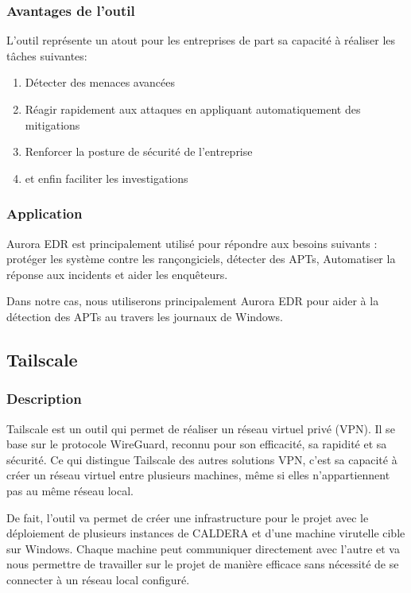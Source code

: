\documentclass[12pt,letterpaper]{article}
\begin{document}
\subsubsection{Avantages de l'outil}

L'outil représente un atout pour les entreprises de part sa capacité à réaliser les tâches suivantes:
\begin{enumerate}
    \item Détecter des menaces avancées
    \item Réagir rapidement aux attaques en appliquant automatiquement des mitigations
    \item Renforcer la posture de sécurité de l'entreprise
    \item et enfin faciliter les investigations
\end{enumerate}

\subsubsection{Application}

Aurora EDR est principalement utilisé pour répondre aux besoins suivants : protéger les système contre les rançongiciels, détecter des APTs, Automatiser la réponse aux incidents et aider les enquêteurs.

\bigskip

Dans notre cas, nous utiliserons principalement Aurora EDR pour aider à la détection des APTs au travers les journaux de Windows.

\subsection{Tailscale}

\subsubsection{Description}

Tailscale est un outil qui permet de réaliser un réseau virtuel privé (VPN). Il se base sur le protocole WireGuard, reconnu pour son efficacité, sa rapidité et sa sécurité. Ce qui distingue Tailscale des autres solutions VPN, c'est sa capacité à créer un réseau virtuel entre plusieurs machines, même si elles n'appartiennent pas au même réseau local.

\bigskip

De fait, l'outil va permet de créer une infrastructure pour le projet avec le déploiement de plusieurs instances de CALDERA et d'une machine virutelle cible sur Windows. Chaque machine peut communiquer directement avec l'autre et va nous permettre de travailler sur le projet de manière efficace sans nécessité de se connecter à un réseau local configuré.
\end{document}
